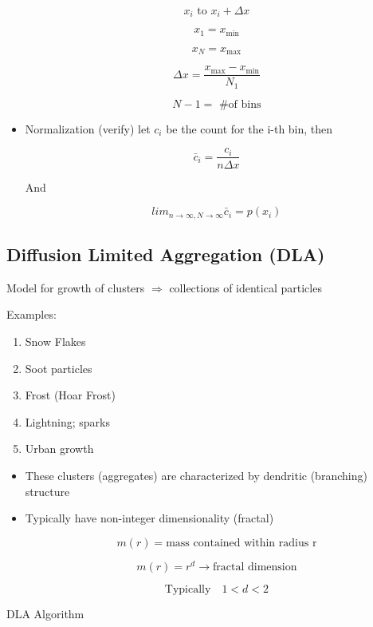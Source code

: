 \begin{itemize}
    \[ x_i \text{ to } x_i+\Delta x\]

    \[ x_1 = x_{\text{min}}\]

    \[ x_N = x_{\text{max}}\]

    \[ \Delta x = \frac{x_{\text{max}}-x_{\text{min}}}{N_1}\]

    \[ N-1 = \text{ \# of bins}\]

    \item Normalization (verify) let $c_i$ be the count for the i-th bin, then

    \[ \bar{c}_i = \frac{c_i}{n\Delta x}\]

    And 

    \[ lim_{n\rightarrow \infty , N \rightarrow \infty} \bar{c}_i = p(x_i)\]
    
\end{itemize}

\subsection{Diffusion Limited Aggregation (DLA)}

Model for growth of clusters $\Rightarrow$ collections of identical particles

Examples:

\begin{enumerate}
    \item Snow Flakes
    \item Soot particles
    \item Frost (Hoar Frost)
    \item Lightning; sparks
    \item Urban growth
\end{enumerate}

\begin{itemize}
    \item These clusters (aggregates) are characterized by dendritic (branching) structure

    \item Typically have non-integer dimensionality (fractal)

    \[ m(r) = \text{mass contained within radius r}\]

    \[ m(r) = r^d \rightarrow \text{fractal dimension}\]

    \[ \text{Typically} \quad 1 < d < 2\]
\end{itemize}

DLA Algorithm 

